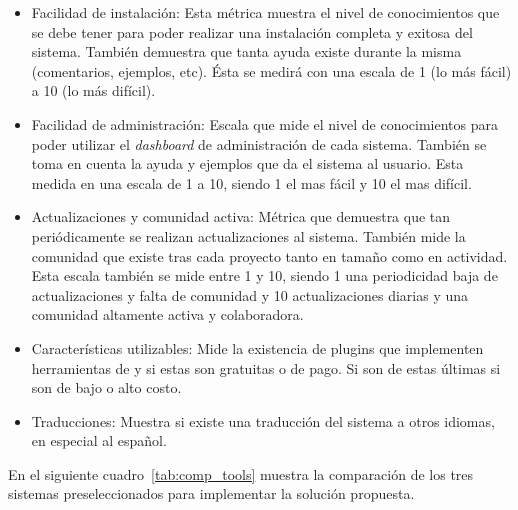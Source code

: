 \begin{itemize}

    \item Facilidad de instalación:
        Esta métrica muestra el nivel de conocimientos que se debe
        tener para poder realizar una instalación completa y exitosa del sistema.
        También demuestra que tanta ayuda existe durante la misma (comentarios,
        ejemplos, etc).
        Ésta se medirá con una escala de 1 (lo más fácil) a 10 (lo más difícil).

    \item Facilidad de administración:
        Escala que mide el nivel de conocimientos para poder utilizar el
        \emph{dashboard} de administración de cada sistema.
        También se toma en cuenta la ayuda y ejemplos que da el sistema al usuario.
        Esta medida en una escala de 1 a 10, siendo 1 el mas fácil y 10 el mas
        difícil.

    \item Actualizaciones y comunidad activa:
        Métrica que demuestra que tan periódicamente se realizan actualizaciones
        al sistema.
        También mide la comunidad que existe tras cada proyecto tanto en tamaño
        como en actividad.
        Esta escala también se mide entre 1 y 10, siendo 1 una periodicidad baja
        de actualizaciones y falta de comunidad y 10 actualizaciones diarias y
        una comunidad altamente activa y colaboradora.

    \item Características utilizables:
        Mide la existencia de plugins que implementen herramientas de {\GAM}
        y si estas son gratuitas o de pago.
        Si son de estas últimas si son de bajo o alto costo.

    \item Traducciones:
        Muestra si existe una traducción del sistema a otros idiomas, en especial
        al español.

\end{itemize}

En el siguiente cuadro~\ref{tab:comp_tools} muestra la comparación de los tres
sistemas preseleccionados para implementar la solución propuesta.

